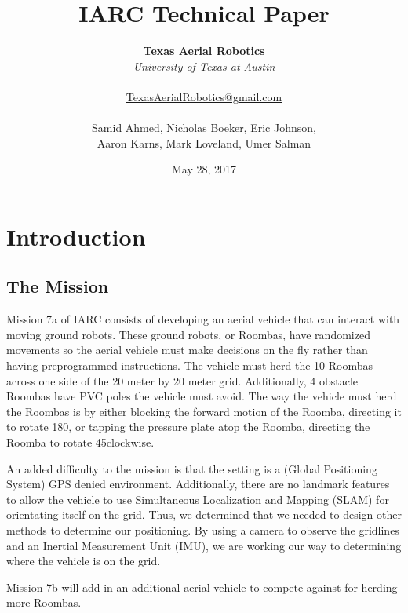 \documentclass[12pt]{article}
\title{IARC Technical Paper}
\author{
	\textbf{Texas Aerial Robotics} \\ 
	\textit{University of Texas at Austin} \\ \\ 
	\href{mailto:TexasAerialRobotics@gmail.com}{TexasAerialRobotics@gmail.com} \\ \\ 
	Samid Ahmed, Nicholas Boeker, Eric Johnson, \\ Aaron Karns, Mark Loveland, Umer Salman}
\date{May 28, 2017}
\begin{document}
\maketitle
\thispagestyle{empty}


\pagebreak
\tableofcontents

\pagebreak

\section{Introduction}
\subsection{The Mission}
Mission 7a of IARC consists of developing an aerial vehicle that can interact with moving ground robots. These ground robots, or Roombas, have randomized movements so the aerial vehicle must make decisions on the fly rather than having preprogrammed instructions. The vehicle must herd the 10 Roombas across one side of the 20 meter by 20 meter grid. Additionally, 4 obstacle Roombas have PVC poles the vehicle must avoid. The way the vehicle must herd the Roombas is by either blocking the forward motion of the Roomba, directing it to rotate 180\degree, or tapping the pressure plate atop the Roomba, directing the Roomba to rotate 45\degree clockwise. 

An added difficulty to the mission is that the setting is a (Global Positioning System) GPS denied environment. Additionally, there are no landmark features to allow the vehicle to use Simultaneous Localization and Mapping (SLAM) for orientating itself on the grid. Thus, we determined that we needed to design other methods to determine our positioning. By using a camera to observe the gridlines and an Inertial Measurement Unit (IMU), we are working our way to determining where the vehicle is on the grid. 

Mission 7b will add in an additional aerial vehicle to compete against for herding more Roombas. 
\end{document}
